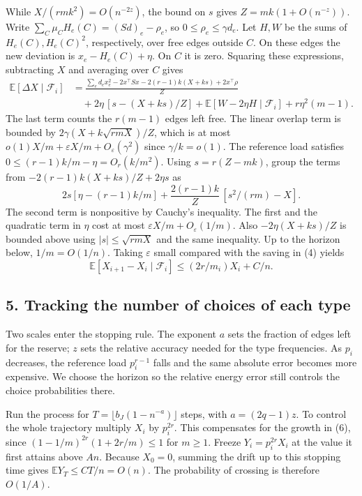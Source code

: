 \documentclass[english,11pt,a4paper]{article}
\begin{document}
While \(X/(rmk^2)=O(n^{-2z})\), the bound on \(s\) gives \(Z=mk(1+O(n^{-z}))\). Write \(\sum_C\mu_C H_e(C)=(Sd)_e-\rho_e\), so \(0\le\rho_e\le\gamma d_e\). Let \(H,W\) be the sums of \(H_e(C),H_e(C)^2\), respectively, over free edges outside \(C\). On these edges the new deviation is \(x_e-H_e(C)+\eta\). On \(C\) it is zero. Squaring these expressions, subtracting \(X\) and averaging over \(C\) gives \[\begin{aligned}
 \mathbb E[\Delta X\mid\mathcal F_i]
 &=\frac{\sum_e d_e x_e^2-2x^\top Sx-2(r-1)k(X+ks)+2x^\top\rho}{Z}\\
 &\quad+2\eta\,[s-(X+ks)/Z]+\mathbb E[W-2\eta H\mid\mathcal F_i]
             +r\eta^2(m-1). 
\end{aligned}\tag{5}\] The last term counts the \(r(m-1)\) edges left free. The linear overlap term is bounded by \(2\gamma(X+k\sqrt{rmX})/Z\), which is at most \(o(1)X/m+\varepsilon X/m+O_\varepsilon(\gamma^2)\) since \(\gamma/k=o(1)\). The reference load satisfies \(0\le(r-1)k/m-\eta=O_r(k/m^2)\). Using \(s=r(Z-mk)\), group the terms from \(-2(r-1)k(X+ks)/Z+2\eta s\) as \[2s[\eta-(r-1)k/m]+\frac{2(r-1)k}{Z}\,[s^2/(rm)-X].\] The second term is nonpositive by Cauchy's inequality. The first and the quadratic term in \(\eta\) cost at most \(\varepsilon X/m+O_\varepsilon(1/m)\). Also \(-2\eta(X+ks)/Z\) is bounded above using \(|s|\le\sqrt{rmX}\) and the same inequality. Up to the horizon below, \(1/m=O(1/n)\). Taking \(\varepsilon\) small compared with the saving in (4) yields \[\mathbb E[X_{i+1}-X_i\mid\mathcal F_i]\le (2r/m_i)X_i+C/n . \tag{6}\]

\subsection{5. Tracking the number of choices of each type}\label{tracking-the-number-of-choices-of-each-type}

Two scales enter the stopping rule. The exponent \(a\) sets the fraction of edges left for the reserve; \(z\) sets the relative accuracy needed for the type frequencies. As \(p_i\) decreases, the reference load \(p_i^{r-1}\) falls and the same absolute error becomes more expensive. We choose the horizon so the relative energy error still controls the choice probabilities there.

Run the process for \(T=\lfloor b_J(1-n^{-a})\rfloor\) steps, with \(a=(2q-1)z\). To control the whole trajectory multiply \(X_i\) by \(p_i^{2r}\). This compensates for the growth in (6), since \((1-1/m)^{2r}(1+2r/m)\le1\) for \(m\ge1\). Freeze \(Y_i=p_i^{2r}X_i\) at the value it first attains above \(An\). Because \(X_0=0\), summing the drift up to this stopping time gives \(\mathbb E Y_T\le CT/n=O(n)\). The probability of crossing is therefore \(O(1/A)\).
\end{document}
